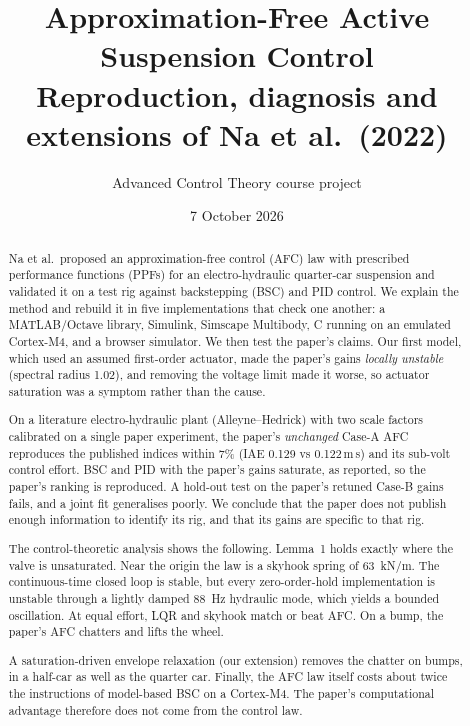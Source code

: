 \documentclass[10pt,a4paper]{article}
\title{\textbf{Approximation-Free Active Suspension Control}\large\\[0.25em]
Reproduction, diagnosis and extensions of Na et al.\ (2022)}
\author{Advanced Control Theory course project}
\date{7 October 2026}
\begin{document}
\maketitle
\vspace{-1.5em}

\begin{abstract}
Na et al.\ proposed an approximation-free control (AFC) law with prescribed performance functions (PPFs) for an electro-hydraulic quarter-car suspension and validated it on a test rig against backstepping (BSC) and PID control. We explain the method and rebuild it in five implementations that check one another: a MATLAB/Octave library, Simulink, Simscape Multibody, C running on an emulated Cortex-M4, and a browser simulator. We then test the paper's claims. Our first model, which used an assumed first-order actuator, made the paper's gains \emph{locally unstable} (spectral radius 1.02), and removing the voltage limit made it worse, so actuator saturation was a symptom rather than the cause.

On a literature electro-hydraulic plant (Alleyne--Hedrick) with two scale factors calibrated on a single paper experiment, the paper's \emph{unchanged} Case-A AFC reproduces the published indices within 7\% (IAE 0.129 vs 0.122\,m\,s) and its sub-volt control effort. BSC and PID with the paper's gains saturate, as reported, so the paper's ranking is reproduced. A hold-out test on the paper's retuned Case-B gains fails, and a joint fit generalises poorly. We conclude that the paper does not publish enough information to identify its rig, and that its gains are specific to that rig.

The control-theoretic analysis shows the following. Lemma~1 holds exactly where the valve is unsaturated. Near the origin the law is a skyhook spring of \SI{63}{kN/m}. The continuous-time closed loop is stable, but every zero-order-hold implementation is unstable through a lightly damped \SI{88}{Hz} hydraulic mode, which yields a bounded oscillation. At equal effort, LQR and skyhook match or beat AFC. On a bump, the paper's AFC chatters and lifts the wheel.

A saturation-driven envelope relaxation (our extension) removes the chatter on bumps, in a half-car as well as the quarter car. Finally, the AFC law itself costs about twice the instructions of model-based BSC on a Cortex-M4. The paper's computational advantage therefore does not come from the control law.
\end{abstract}
\end{document}
